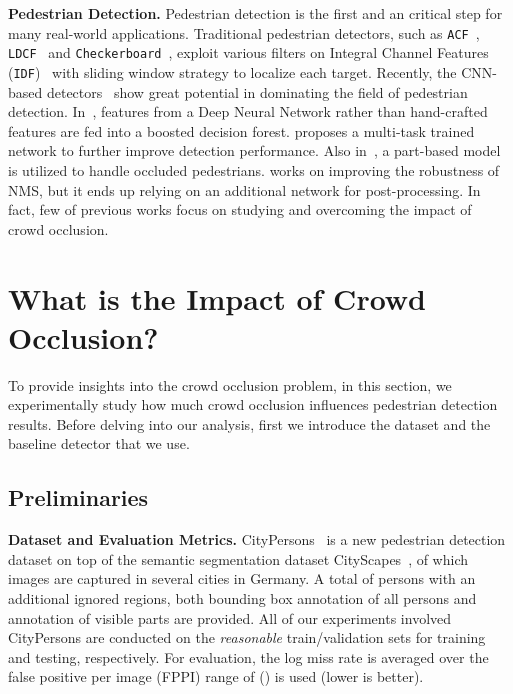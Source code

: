 \documentclass[10pt,twocolumn,letterpaper]{article}
\newcommand{\myparagraph}[1]{{\vspace{0.5em} \noindent \bf #1}}
\begin{document}
\myparagraph{Pedestrian Detection.} Pedestrian detection is the first and an critical step for many real-world applications. Traditional pedestrian detectors, such as \verb'ACF'~\cite{dollar2014fast}, \verb'LDCF'~\cite{nam2014local} and \verb'Checkerboard'~\cite{zhang2015filtered}, exploit various filters on Integral Channel Features (\verb'IDF')~\cite{dollar2009integral} with sliding window strategy to localize each target. Recently, the CNN-based detectors~\cite{li2017scale,zhang2016faster,mao2017can,hosang2015taking,yang2015convolutional} show great potential in dominating the field of pedestrian detection. In~\cite{yang2015convolutional,zhang2016faster}, features from a Deep Neural Network rather than hand-crafted features are fed into a boosted decision forest. \cite{mao2017can} proposes a multi-task trained network to further improve detection performance. Also in~\cite{ouyang2012discriminative,tian2015deep,zhou2017multi}, a part-based model is utilized to handle occluded pedestrians. \cite{Hosang_2017_CVPR} works on improving the robustness of NMS, but it ends up relying on an additional network for post-processing. In fact, few of previous works focus on studying and overcoming the impact of crowd occlusion.

\section{What is the Impact of Crowd Occlusion?}
\label{sec:howmuchanalysis}


To provide insights into the crowd occlusion problem, in this section, we experimentally study how much crowd occlusion influences pedestrian detection results. Before delving into our analysis, first we introduce the dataset and the baseline detector that we use.

\subsection{Preliminaries}
\myparagraph{Dataset and Evaluation Metrics.}
CityPersons~\cite{zhang2017citypersons} is a new pedestrian detection dataset on top of the semantic segmentation dataset CityScapes~\cite{cordts2016cityscapes}, of which  images are captured in several cities in Germany. A total of  persons with an additional  ignored regions, both bounding box annotation of all persons and annotation of visible parts are provided. All of our experiments involved CityPersons are conducted on the {\it reasonable} train/validation sets for training and testing, respectively. For evaluation, the log miss rate is averaged over the false positive per image (FPPI) range of  () is used (lower is better).
\end{document}
